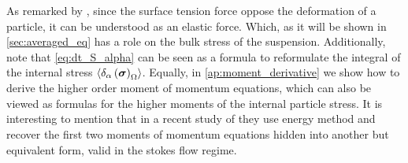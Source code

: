 As remarked by \citet{batchelor1970stress}, since the surface tension force oppose the deformation of a particle, it can be understood as an elastic force. 
Which, as it will be shown in \ref{sec:averaged_eq} has a role on the bulk stress of the suspension. 
Additionally, note that \ref{eq:dt_S_alpha} can be seen as a formula to reformulate the integral of the internal stress $\left<\delta_\alpha \left( \bm{\sigma} \right)_\Omega\right>$.
Equally, in \ref{ap:moment_derivative} we show how to derive the higher order moment of momentum equations, which can also be viewed as formulas for the higher moments of the internal particle stress. 
It is interesting to mention that in a recent study of \citet{dolata2021faxen} they use energy method and recover the first two moments of momentum equations hidden into another but equivalent form, valid in the stokes flow regime. 

